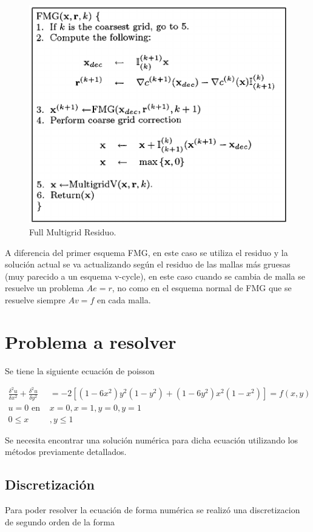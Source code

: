 \documentclass[letter, 10pt]{article}
\begin{document}
\begin{figure}
    \centering
    \includegraphics[scale=0.5]{FMG.png}
    \caption{Full Multigrid Residuo.}
    \label{fig:FMG}
\end{figure}


A diferencia del primer esquema FMG, en este caso se utiliza el residuo y la solución actual se va actualizando según el residuo de las mallas más gruesas (muy parecido a un esquema v-cycle), en este caso cuando se cambia de malla se resuelve un problema $Ae = r$, no como en el esquema normal de FMG que se resuelve siempre $Av=f$ en cada malla.


\section{Problema a resolver}

Se tiene la siguiente ecuación de poisson

\begin{align}
    \frac{\delta^2 u}{\delta x^2} + \frac{\delta^2 u}{\delta y^2} &= -2 \left[(1-6x^2) y^2 (1-y^2) + (1-6y^2) x^2 (1-x^2)\right] = f(x,y)  \\
     u = 0\text{ en }&x=0,x=1,y=0,y=1 \\
      0 \leq x&,y \leq 1
\end{align}

Se necesita encontrar una solución numérica para dicha ecuación utilizando los métodos previamente detallados.

\subsection{Discretización}
Para poder resolver la ecuación de forma numérica se realizó una discretizacion de segundo orden de la forma
\end{document}
